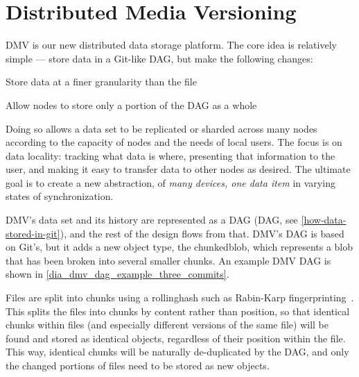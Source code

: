 \section{Distributed Media Versioning}




\gls{DMV} is our new distributed data storage platform.
The core idea is relatively simple --- store data in a Git-like \gls{DAG}, but make the following changes:

\begin{tight_enumerate}

    \item{Store data at a finer granularity than the file}

    \item{Allow nodes to store only a portion of the \gls{DAG} as a whole}

\end{tight_enumerate}

Doing so allows a data set to be replicated or sharded across many nodes according to the capacity of nodes and the needs of local users.
The focus is on data locality: tracking what data is where, presenting that information to the user, and making it easy to transfer data to other nodes as desired.
The ultimate goal is to create a new abstraction, of \emph{many devices, one data item} in varying states of synchronization.

%

\gls{DMV}'s data set and its history are represented as a \acrshort{DAG} (\acrlong{DAG}, see \autoref{how-data-stored-in-git}), and the rest of the design flows from that.
\gls{DMV}'s \gls{DAG} is based on Git's, but it adds a new object type, the \gls{chunkedblob}, which represents a \gls{blob} that has been broken into several smaller chunks.
An example \gls{DMV} \gls{DAG} is shown in \autoref{dia_dmv_dag_example_three_commits}.


Files are split into chunks using a \gls{rollinghash} such as Rabin-Karp fingerprinting~\cite{rabin_karp_fingerprinting}.
This splits the files into chunks by content rather than position, so that identical chunks within files (and especially different versions of the same file) will be found and stored as identical objects, regardless of their position within the file.
This way, identical chunks will be naturally de-duplicated by the \gls{DAG}, and only the changed portions of files need to be stored as new objects.


